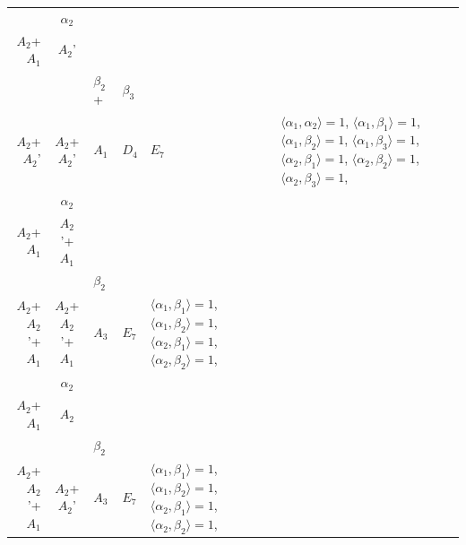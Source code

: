 \documentclass[12pt]{report}
\begin{document}
\begin{appendix}
{\begin{longtable}{rcl p{1cm}p{1cm}p{3cm} }
\\
\begin{tabular}{cc}$\alpha_1$+ & $\alpha_2$\\\tiny{ $A_2$+$A_1$ } & \tiny{ $A_2$' }\end{tabular} &\begin{tabular}{c} = \\~ \end{tabular} & \begin{tabular}{ccc}$\beta_1$+ & $\beta_2$+ & $\beta_3$\\\tiny{ $A_2$+$A_2$' } & \tiny{ $A_2$+$A_2$' } & \tiny{ $A_1$ }\end{tabular} & $D_4$ & $E_7$ & $\langle\alpha_1, \alpha_2\rangle=1$,  $\langle\alpha_1, \beta_1\rangle=1$, $\langle\alpha_1, \beta_2\rangle=1$, $\langle\alpha_1, \beta_3\rangle=1$, $\langle\alpha_2, \beta_1\rangle=1$, $\langle\alpha_2, \beta_2\rangle=1$, $\langle\alpha_2, \beta_3\rangle=1$, 
\\
\begin{tabular}{cc}$\alpha_1$+ & $\alpha_2$\\\tiny{ $A_2$+$A_1$ } & \tiny{ $A_2$'+$A_1$ }\end{tabular} &\begin{tabular}{c} = \\~ \end{tabular} & \begin{tabular}{cc}$\beta_1$+ & $\beta_2$\\\tiny{ $A_2$+$A_2$'+$A_1$ } & \tiny{ $A_2$+$A_2$'+$A_1$ }\end{tabular} & $A_3$ & $E_7$ &  $\langle\alpha_1, \beta_1\rangle=1$, $\langle\alpha_1, \beta_2\rangle=1$, $\langle\alpha_2, \beta_1\rangle=1$, $\langle\alpha_2, \beta_2\rangle=1$, 
\\
\begin{tabular}{cc}$\alpha_1$+ & $\alpha_2$\\\tiny{ $A_2$+$A_1$ } & \tiny{ $A_2$ }\end{tabular} &\begin{tabular}{c} = \\~ \end{tabular} & \begin{tabular}{cc}$\beta_1$+ & $\beta_2$\\\tiny{ $A_2$+$A_2$'+$A_1$ } & \tiny{ $A_2$+$A_2$' }\end{tabular} & $A_3$ & $E_7$ &  $\langle\alpha_1, \beta_1\rangle=1$, $\langle\alpha_1, \beta_2\rangle=1$, $\langle\alpha_2, \beta_1\rangle=1$, $\langle\alpha_2, \beta_2\rangle=1$, 

\end{longtable}}
\end{appendix}
\end{document}
